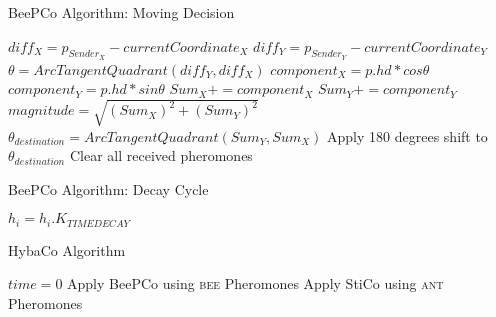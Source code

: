 \begin{algorithm}
  \caption{BeePCo Algorithm\cite{Caliskanelli2015}: Moving Decision}
  \label{desSysPseuBeeMovDec}
  \begin{algorithmic}[1]
        \State $ diff_{X} = p_{Sender_{X} } - currentCoordinate_{X} $
        \State $ diff_{Y} = p_{Sender_{Y} } - currentCoordinate_{Y} $
        \State $ \theta = ArcTangentQuadrant(diff_{Y}, diff_{X} ) $
        \State $ component_{X} = p.hd * cos\theta $
        \State $ component_{Y} = p.hd * sin\theta $
        \State $ Sum_{X} += component_{X} $
        \State $ Sum_{Y} += component_{Y} $
      \EndFor
    \EndIf
    \State $ magnitude = \sqrt{ (Sum_{X} )^{2} + (Sum_{Y} )^{2} } $
    \State $ \theta_{destination} = ArcTangentQuadrant(Sum_{Y},Sum_{X} ) $
    \State Apply 180 degrees shift to $ \theta_{destination} $
    \State Clear all received pheromones
  \end{algorithmic}
\end{algorithm}

\begin{algorithm}
  \caption{BeePCo Algorithm\cite{Caliskanelli2015}: Decay Cycle}
  \label{desSysPseuBeeDecay}
  \begin{algorithmic}[1]
      \State $ h_{i} = h_{i}.K_{TIMEDECAY} $
    \EndFor
  \end{algorithmic}
\end{algorithm}

\begin{algorithm}
  \caption{HybaCo Algorithm\cite{Broecker2015Demo} }
  \label{desSysPseuHybaCo}
  \begin{algorithmic}[1]
    \State $ time = 0 $
    \Loop
        \State Apply BeePCo using \textsc{bee} Pheromones
      \Else
        \State Apply StiCo using  \textsc{ant} Pheromones
      \EndIf
    \EndLoop
  \end{algorithmic}
\end{algorithm}

\clearpage


